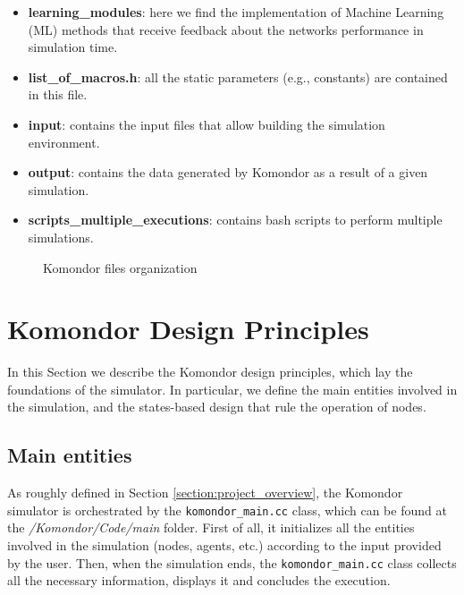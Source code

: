 \documentclass[a4paper]{article}
\begin{document}
\begin{itemize}
	\item \textbf{learning\_modules}: here we find the implementation of Machine Learning (ML) methods that receive feedback about the networks performance in simulation time. 
	\item \textbf{list\_of\_macros.h}: all the static parameters (e.g., constants) are contained in this file.
	\item \textbf{input}: contains the input files that allow building the simulation environment.
	\item \textbf{output}: contains the data generated by Komondor as a result of a given simulation.	
	\item \textbf{scripts\_multiple\_executions}: contains bash scripts to perform multiple simulations.
\end{itemize} 

\begin{figure}[h!]
	\centering
	\caption{Komondor files organization}
	\label{fig:komondor_files}
\end{figure}	
	
\section{Komondor Design Principles}
\label{section:system_model}
In this Section we describe the Komondor design principles, which lay the foundations of the simulator. In particular, we define the main entities involved in the simulation, and the states-based design that rule the operation of nodes.

\subsection{Main entities}
\label{section:main_entities}
As roughly defined in Section \ref{section:project_overview}, the Komondor simulator is orchestrated by the \texttt{komondor\_main.cc} class, which can be found at the \textit{/Komondor/Code/main} folder. First of all, it initializes all the entities involved in the simulation (nodes, agents, etc.) according to the input provided by the user. Then, when the simulation ends, the \texttt{komondor\_main.cc} class collects all the necessary information, displays it and concludes the execution.
\end{document}
